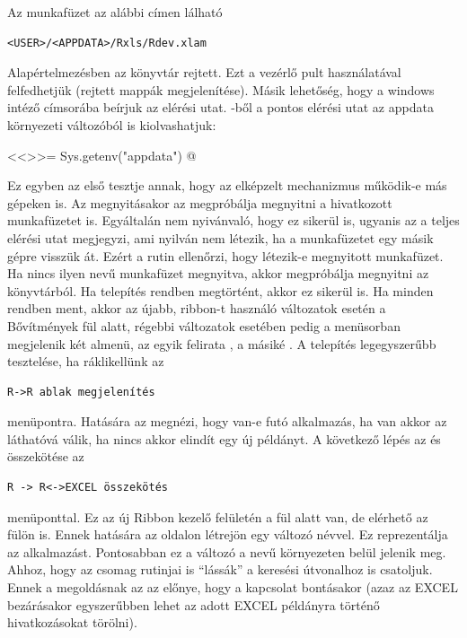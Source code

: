 Az  munkafüzet az alábbi címen lálható
\begin{verbatim}
<USER>/<APPDATA>/Rxls/Rdev.xlam
\end{verbatim}
Alapértelmezésben az  könyvtár rejtett. Ezt a vezérlő
pult használatával felfedhetjük (rejtett mappák megjelenítése). Másik
lehetőség, hogy a windows intéző címsorába 
beírjuk az elérési utat. -ből a pontos elérési utat az appdata
környezeti változóból is kiolvashatjuk: 
\begin{Rnw}
<<>>=
Sys.getenv("appdata")
@  
\end{Rnw}
Ez egyben az első tesztje annak, hogy az elképzelt mechanizmus
működik-e más gépeken is. Az  megnyitásakor az
 megpróbálja megnyitni a hivatkozott  
munkafüzetet is. Egyáltalán nem nyivánvaló, hogy ez sikerül is,
ugyanis az  a teljes elérési utat megjegyzi, ami nyilván
nem létezik, ha a munkafüzetet egy másik gépre visszük 
át. Ezért a  rutin ellenőrzi, hogy létezik-e
megnyitott  munkafüzet. Ha 
nincs ilyen nevű munkafüzet megnyitva, akkor megpróbálja megnyitni az
 könyvtárból. Ha telepítés rendben megtörtént,
akkor ez sikerül is. 
Ha minden rendben ment, akkor az újabb, ribbon-t használó 
változatok esetén a Bővítmények fül alatt, régebbi 
változatok esetében pedig a menüsorban megjelenik két 
almenü, az egyik felirata , a másiké .
A telepítés legegyszerűbb tesztelése, ha ráklikellünk az
\begin{verbatim}
R->R ablak megjelenítés
\end{verbatim}
menüpontra. Hatására az  megnézi, hogy van-e futó 
alkalmazás, ha van akkor az 
láthatóvá válik, ha nincs akkor elindít egy új  példányt. A
következő lépés az  és  
összekötése az
\begin{verbatim}
R -> R<->EXCEL összekötés
\end{verbatim}
menüponttal. Ez az  új Ribbon kezelő felületén a
 fül alatt van, de elérhető az  fülön is. Ennek hatására az  oldalon létrejön
egy változó  névvel. Ez reprezentálja az 
alkalmazást.  Pontosabban ez a változó a  nevű
környezeten belül jelenik meg. Ahhoz, hogy az  csomag
rutinjai is ``lássák'' a keresési útvonalhoz is csatoljuk. Ennek a
megoldásnak az az előnye, hogy a kapcsolat bontásakor (azaz az EXCEL
bezárásakor egyszerűbben lehet az adott EXCEL példányra történő
hivatkozásokat törölni). 

